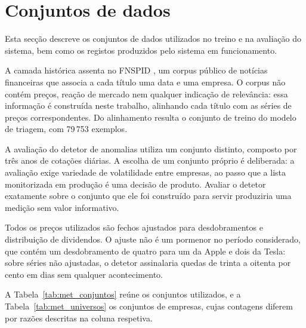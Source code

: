\section{Conjuntos de dados}
\label{sec:met_dados}

Esta secção descreve os conjuntos de dados utilizados no treino e na avaliação do sistema, bem
como os registos produzidos pelo sistema em funcionamento.

A camada histórica assenta no \gls{FNSPID} \autocite{dong2024fnspid}, um corpus público de notícias
financeiras que associa a cada título uma data e uma empresa. O corpus não contém preços, reação de mercado nem qualquer indicação de
relevância: essa informação é construída neste trabalho, alinhando cada título com as séries de
preços correspondentes. Do alinhamento resulta o conjunto de treino do modelo de triagem, com
79\,753 exemplos.

A avaliação do detetor de anomalias utiliza um conjunto distinto, composto por três anos de
cotações diárias. A escolha de um conjunto próprio é deliberada: a avaliação exige variedade de
volatilidade entre empresas, ao passo que a lista monitorizada em produção é uma decisão de
produto. Avaliar o detetor exatamente sobre o conjunto que ele foi construído para servir
produziria uma medição sem valor informativo.

Todos os preços utilizados são fechos ajustados para desdobramentos e distribuição de dividendos.
O ajuste não é um pormenor no período considerado, que contém um desdobramento de quatro para um
da Apple e dois da Tesla: sobre séries não ajustadas, o detetor assinalaria quedas de trinta a
oitenta por cento em dias sem qualquer acontecimento.

A Tabela~\ref{tab:met_conjuntos} reúne os conjuntos utilizados, e a
Tabela~\ref{tab:met_universos} os conjuntos de empresas, cujas contagens diferem por razões
descritas na coluna respetiva.

